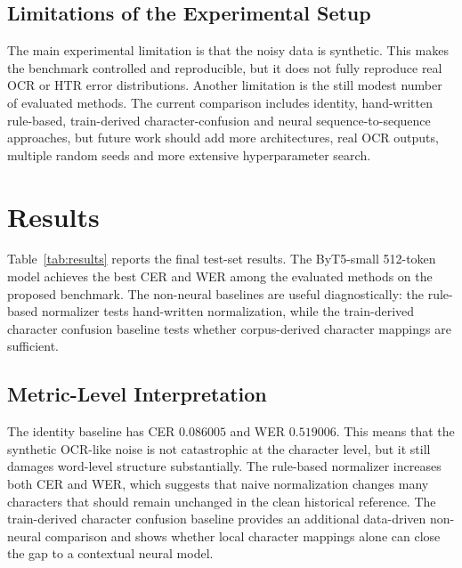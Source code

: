 \documentclass{article}
\begin{document}
\subsection{Limitations of the Experimental Setup}

The main experimental limitation is that the noisy data is synthetic. This makes the benchmark controlled and reproducible, but it does not fully reproduce real OCR or HTR error distributions. Another limitation is the still modest number of evaluated methods. The current comparison includes identity, hand-written rule-based, train-derived character-confusion and neural sequence-to-sequence approaches, but future work should add more architectures, real OCR outputs, multiple random seeds and more extensive hyperparameter search.



\section{Results}
\label{sec:results}

Table~\ref{tab:results} reports the final test-set results. The ByT5-small 512-token model achieves the best CER and WER among the evaluated methods on the proposed benchmark. The non-neural baselines are useful diagnostically: the rule-based normalizer tests hand-written normalization, while the train-derived character confusion baseline tests whether corpus-derived character mappings are sufficient.

\begin{table}[tbh!]
\begin{center}

\caption{Main test results on the proposed benchmark. Lower CER and WER are better; higher Exact Match is better.}
\label{tab:results}
\end{center}
\end{table}

\subsection{Metric-Level Interpretation}

The identity baseline has CER $0.086005$ and WER $0.519006$. This means that the synthetic OCR-like noise is not catastrophic at the character level, but it still damages word-level structure substantially. The rule-based normalizer increases both CER and WER, which suggests that naive normalization changes many characters that should remain unchanged in the clean historical reference. The train-derived character confusion baseline provides an additional data-driven non-neural comparison and shows whether local character mappings alone can close the gap to a contextual neural model.
\end{document}
